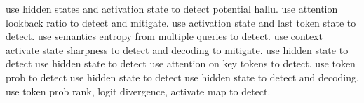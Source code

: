 \cite{beigi2024internalinspector} use hidden states and activation state to detect potential hallu.
\cite{chuang2024lookback} use attention lookback ratio to detect and mitigate.
\cite{ji2024llm} use activation state and last token state to detect.
\cite{kossen2024semantic} use semantics entropy from multiple queries to detect.
\cite{chen2024context} use context activate state sharpness to detect and decoding to mitigate.
\cite{chen2024inside} use hidden state to detect
\cite{su2024unsupervised} use hidden state to detect
\cite{yuksekgonul2023attention} use attention on key tokens to detect.
\cite{quevedo2024detecting} use token prob to detect
\cite{duan2024llms} use hidden state to detect
\cite{azaria2023internal} use hidden state to detect and decoding.
\cite{he2024llm} use token prob rank, logit divergence, activate map to detect.


